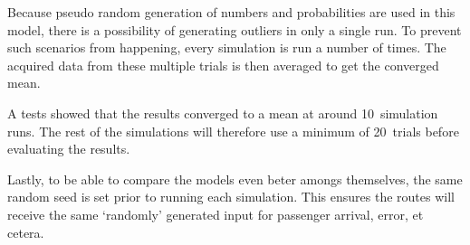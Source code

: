 Because pseudo random generation of numbers and probabilities are used in this model, there is a possibility of generating outliers in only a single run. To prevent such scenarios from happening, every simulation is run a number of times. The acquired data from these multiple trials is then averaged to get the converged mean.

A tests showed that the results converged to a mean at around 10~simulation runs. The rest of the simulations will therefore use a minimum of 20~trials before evaluating the results.

Lastly, to be able to compare the models even beter amongs themselves, the same random seed is set prior to running each simulation. This ensures the routes will receive the same `randomly' generated input for passenger arrival, error, et cetera.